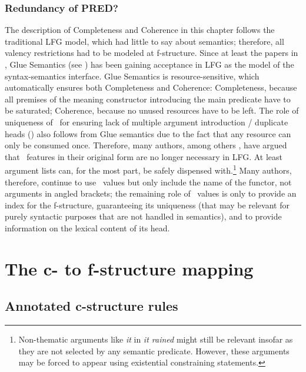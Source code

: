 \documentclass[output=paper,hidelinks]{langscibook}
\begin{document}
 \subsubsection{Redundancy of PRED?\label{sect:redundancy}}

 The description of Completeness and Coherence in this chapter follows the traditional LFG model, which had little to say about semantics; therefore, all valency restrictions had to be modeled at f-structure. Since at least the papers in \textcite{dalrympleetal93}, Glue Semantics (see ) has been gaining acceptance in LFG as the model of the syntax-semantics interface. Glue Semantics is resource-sensitive, which automatically ensures both Completeness and Coherence: Completeness, because all premises of the meaning constructor introducing the main predicate have to be saturated; Coherence, because no unused resources have to be left. The role of uniqueness of \PRED\ for ensuring lack of multiple argument introduction / duplicate heads () also follows from Glue semantics due to the fact that any resource can only be consumed once. Therefore, many authors, among others \textcite{kuhn2001,AsudGior12,asudeh2014meaning}, have argued that \PRED\ features in their original form are no longer necessary in LFG. At least argument lists can, for the most part, be safely dispensed with.\footnote{Non-thematic arguments like \textit{it} in \textit{it rained} might still be relevant insofar as they are not selected by any semantic predicate. However, these arguments may be forced to appear using existential constraining statements.} Many authors, therefore, continue to use \PRED\ values but only include the name of the functor, not arguments in angled brackets; the remaining role of \PRED\ values is only to provide an index for the f-structure, guaranteeing its uniqueness (that may be relevant for purely syntactic purposes that are not handled in semantics), and to provide information on the lexical content of its head.

\section{The c- to f-structure mapping\label{sect:metalanguage}}
 
 
 \subsection{Annotated c-structure rules\label{sect:annotated}}
 
\end{document}

